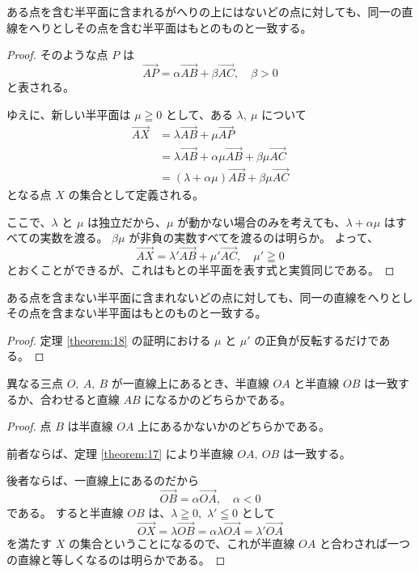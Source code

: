 \begin{thm}\label{theorem:18}
  ある点を含む半平面に含まれるがへりの上にはないどの点に対しても、同一の直線をへりとしその点を含む半平面はもとのものと一致する。
\end{thm}

\begin{proof}
  そのような点 \(P\) は
  \[\overrightarrow{AP}=\alpha\overrightarrow{AB}+\beta\overrightarrow{AC},\quad \beta>0\]
  と表される。

  ゆえに、新しい半平面は \(\mu\geqq0\) として、ある \(\lambda,\ \mu\) について
  \begin{align*}
    \overrightarrow{AX} &= \lambda\overrightarrow{AB}+\mu\overrightarrow{AP} \\
                        &= \lambda\overrightarrow{AB}+\alpha\mu\overrightarrow{AB}+\beta\mu\overrightarrow{AC} \\
                        &= (\lambda+\alpha\mu)\overrightarrow{AB}+\beta\mu\overrightarrow{AC}
  \end{align*}
  となる点 \(X\) の集合として定義される。

  ここで、\(\lambda\) と \(\mu\) は独立だから、\(\mu\) が動かない場合のみを考えても、\(\lambda+\alpha\mu\) はすべての実数を渡る。
  \(\beta\mu\) が非負の実数すべてを渡るのは明らか。
  よって、
  \[\overrightarrow{AX}=\lambda'\overrightarrow{AB}+\mu'\overrightarrow{AC},\quad \mu'\geqq0\]
  とおくことができるが、これはもとの半平面を表す式と実質同じである。
\end{proof}

\begin{thm}\label{theorem:19}
  ある点を含まない半平面に含まれないどの点に対しても、同一の直線をへりとしその点を含まない半平面はもとのものと一致する。
\end{thm}

\begin{proof}
  定理 \ref{theorem:18} の証明における \(\mu\) と \(\mu'\) の正負が反転するだけである。
\end{proof}

\begin{thm}\label{theorem:20}
  異なる三点 \(O,\ A,\ B\) が一直線上にあるとき、半直線 \(OA\) と半直線 \(OB\) は一致するか、合わせると直線 \(AB\) になるかのどちらかである。
\end{thm}

\begin{proof}
  点 \(B\) は半直線 \(OA\) 上にあるかないかのどちらかである。

  前者ならば、定理 \ref{theorem:17} により半直線 \(OA,\ OB\) は一致する。

  後者ならば、一直線上にあるのだから
  \[\overrightarrow{OB}=\alpha\overrightarrow{OA},\quad \alpha<0\]
  である。
  すると半直線 \(OB\) は、\(\lambda\geqq0,\) \(\lambda'\leqq0\) として
  \[\overrightarrow{OX}=\lambda\overrightarrow{OB}=\alpha\lambda\overrightarrow{OA}=\lambda'\overrightarrow{OA}\]
  を満たす \(X\) の集合ということになるので、これが半直線 \(OA\) と合わされば一つの直線と等しくなるのは明らかである。
\end{proof}
